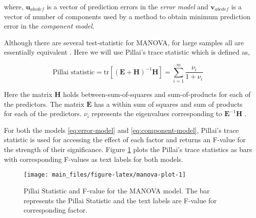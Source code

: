 \documentclass[12pt,3p,authoryear]{elsarticle}
\begin{document}
where, \(\mathbf{u}_{abcdef}\) is a vector of prediction errors in the
\emph{error model} and \(\mathbf{v}_{abcdef}\) is a vector of number of
components used by a method to obtain minimum prediction error in the
\emph{component model}.

Although there are several test-statistic for MANOVA, for large samples
all are essentially equivalent \citep{johnson2018applied}. Here we will
use Pillai's trace statistic which is defined as,

\begin{equation}
\text{Pillai statistic} = \text{tr}\left[
\left(\mathbf{E} + \mathbf{H}\right)^{-1}\mathbf{H}
\right] = \sum_{i=1}^m{\frac{\nu_i}{1 + \nu_i}}
\label{eq:pillai}
\end{equation}

Here the matrix \(\mathbf{H}\) holds between-sum-of-squares and
sum-of-products for each of the predictors. The matrix \(\mathbf{E}\)
has a within sum of squares and sum of products for each of the
predictors. \(\nu_i\) represents the eigenvalues corresponding to
\(\mathbf{E}^{-1}\mathbf{H}\) \citep{rencher2003methods}.

For both the models \eqref{eq:error-model} and \eqref{eq:component-model},
Pillai's trace statistic is used for accessing the effect of each factor
and returns an F-value for the strength of their significance. Figure
\ref{fig:manova-plot} plots the Pillai's trace statistics as bars with
corresponding F-values as text labels for both models.





\begin{figure}
\texttt{[image: main\_files/figure-latex/manova-plot-1]} \caption{Pillai Statistic and F-value for the MANOVA model. The
bar represents the Pillai Statistic and the text labels are F-value for
corresponding factor.}\label{fig:manova-plot}
\end{figure}
\end{document}
